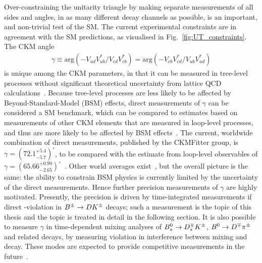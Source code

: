 Over-constraining the unitarity triangle by making separate measurements of all sides and angles, in as many different decay channels as possible, is an important, and non-trivial test of the SM. The current experimental constraints are in agreement with the SM predictions, as visualised in Fig.~\ref{fig:UT_constraints}. 
The CKM angle
\begin{align}\label{eq:gamma_definition}
    \gamma \equiv \mathrm{arg} (-V_{ud}^{\phantom{*}}V_{ub}^*/V_{cd}^{\phantom{*}}V_{cb}^*)
    = \mathrm{arg} (-V_{cb}^{\phantom{*}}V_{cd}^*/V_{ub}^{\phantom{*}}V_{ud}^*)
\end{align}
is unique among the CKM parameters, in that it can be measured in tree-level processes without significant theoretical uncertainty from lattice QCD calculations~\cite{brodUltimateTheoreticalError2014}.  Because tree-level processes are less likely to be affected by Beyond-Standard-Model (BSM) effects, direct measurements of $\gamma$ can be considered a SM benchmark, which can be compared to estimates based on measurements of other CKM elements that are measured in loop-level processes, and thus are more likely to be affected by BSM effects~\cite{blankeEmergingDeltaDMdanomaly2019}. 
The current, worldwide combination of direct measurements, published by the CKMFitter group, is $\gamma = (72.1^{+5.4}_{-5.7})^\circ $, to be compared with the estimate from loop-level observables of $\gamma = (65.66^{+0.90}_{-2.65})^\circ $~\cite{CKMfitter2015}. Other world averages exist~\cite{HFLAV,UTfit-UT}, but the overall picture is the same: the ability to constrain BSM physics is currently limited by the uncertainty of the direct measurements. Hence further precision measurements of $\gamma$ are highly motivated. Presently, the precision is driven by time-integrated measurements if direct \CP-violation in ${{B}^\pm}\rightarrow{\ensuremath{D}}{\ensuremath{{K}^\pm}}$ decays; such a measurement is the topic of this thesis and the topic is treated in detail in the following section. It is also possible to measure $\gamma$ in time-dependent mixing analyses of ${{B}^0_{s}}\rightarrow{\ensuremath{{D}^{\mp}_{s}}}{\ensuremath{{K}^\pm}}$, ${{B}^0}\rightarrow{\ensuremath{{D}^\mp}}{\ensuremath{{\pi}^\pm}}$ and related decays, by measuring \CP violation in interference between mixing and decay. These modes are expected to provide competitive measurements in the future~\cite{kouBelleIIPhysics2019,lhcbcollaborationPhysicsCaseLHCb2019}.



